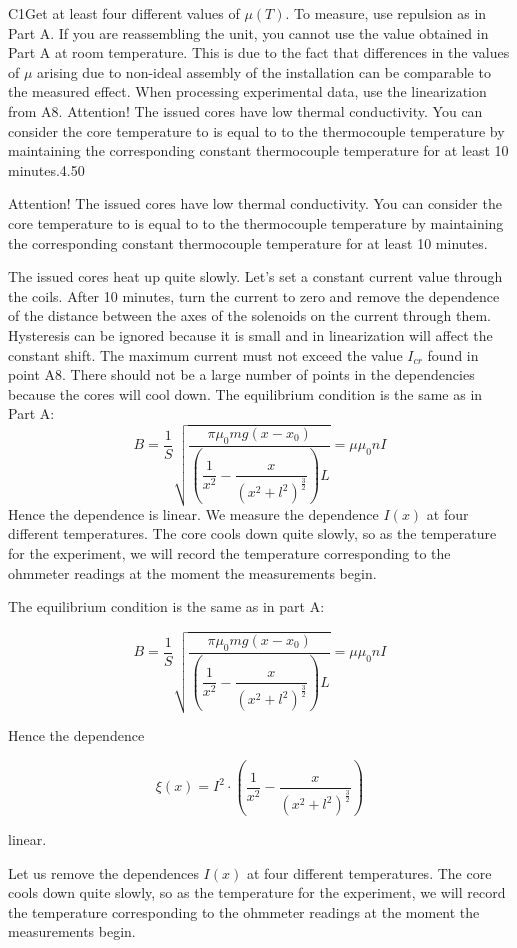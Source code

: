 \documentclass[11pt,a4paper]{article}
\begin{document}
\begin{solcard}{C1}{Get at least four different values of $\mu(T)$. To measure, use repulsion as in Part A. If you are reassembling the unit, you cannot use the value obtained in Part A at room temperature. This is due to the fact that differences in the values of $\mu$ arising due to non-ideal assembly of the installation can be comparable to the measured effect. When processing experimental data, use the linearization from A8. Attention! The issued cores have low thermal conductivity. You can consider the core temperature to is equal to to the thermocouple temperature by maintaining the corresponding constant thermocouple temperature for at least 10 minutes.}{4.50}

Attention! The issued cores have low thermal conductivity. You can consider the core temperature to is equal to to the thermocouple temperature by maintaining the corresponding constant thermocouple temperature for at least 10 minutes.


The issued cores heat up quite slowly. Let's set a constant current value through the coils. After 10 minutes, turn the current to zero and remove the dependence of the distance between the axes of the solenoids on the current through them. Hysteresis can be ignored because it is small and in linearization will affect the constant shift. The maximum current must not exceed the value $I_{cr}$ found in point A8. There should not be a large number of points in the dependencies because the cores will cool down. The equilibrium condition is the same as in Part A: $$B=\dfrac{ 1}{S} \sqrt{\dfrac{ \pi \mu_{0} m g (x-x_{0})}{\left(\dfrac{1}{x^2}-\dfrac{x}{(x^2+l^2)^{\frac{3}{2}}}\right)L}}=\mu\mu_0 nI$$ Hence the dependence is linear. We measure the dependence $I(x)$ at four different temperatures. The core cools down quite slowly, so as the temperature for the experiment, we will record the temperature corresponding to the ohmmeter readings at the moment the measurements begin.


The equilibrium condition is the same as in part A:


$$B=\dfrac{ 1}{S} \sqrt{\dfrac{ \pi \mu_{0} m g (x-x_{0})}{\left(\dfrac{1}{x^2}-\dfrac{x}{(x^2+l^2)^{\frac{3}{2}}}\right)L}}=\mu\mu_0 nI$$


Hence the dependence


\[\xi(x)=I^2\cdot\left(\dfrac{1}{x^2}-\dfrac{x}{(x^2+l^2)^{\frac{3}{2}}}\right)  \]


linear.


Let us remove the dependences $I(x)$ at four different temperatures. The core cools down quite slowly, so as the temperature for the experiment, we will record the temperature corresponding to the ohmmeter readings at the moment the measurements begin.



\end{solcard}
\end{document}
